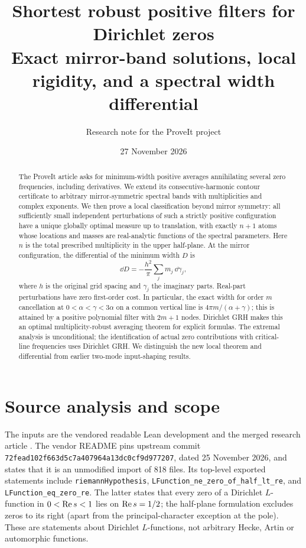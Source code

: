 \documentclass[11pt]{article}
\title{\textbf{Shortest robust positive filters for Dirichlet zeros}\\[4pt]\large Exact mirror-band solutions, local rigidity, and a spectral width differential}
\author{Research note for the ProveIt project}
\date{27 November 2026}
\theoremstyle{remark}\newtheorem{remark}[theorem]{Remark}
\begin{document}
\maketitle
\begin{abstract}
The ProveIt article asks for minimum-width positive averages annihilating several zero frequencies, including derivatives. We extend its consecutive-harmonic contour certificate to arbitrary mirror-symmetric spectral bands with multiplicities and complex exponents. We then prove a local classification beyond mirror symmetry: all sufficiently small independent perturbations of such a strictly positive configuration have a unique globally optimal measure up to translation, with exactly $n+1$ atoms whose locations and masses are real-analytic functions of the spectral parameters. Here $n$ is the total prescribed multiplicity in the upper half-plane. At the mirror configuration, the differential of the minimum width $D$ is
\[
 \dd D=-\frac{h^2}{\pi}\sum_j m_j\,\dd\gamma_j,
\]
where $h$ is the original grid spacing and $\gamma_j$ the imaginary parts. Real-part perturbations have zero first-order cost. In particular, the exact width for order $m$ cancellation at $0<\alpha<\gamma<3\alpha$ on a common vertical line is $4\pi m/(\alpha+\gamma)$; this is attained by a positive polynomial filter with $2m+1$ nodes. Dirichlet GRH makes this an optimal multiplicity-robust averaging theorem for explicit formulas. The extremal analysis is unconditional; the identification of actual zero contributions with critical-line frequencies uses Dirichlet GRH. We distinguish the new local theorem and differential from earlier two-mode input-shaping results.
\end{abstract}
\tableofcontents
\section{Source analysis and scope}
The inputs are the vendored readable Lean development \cite{vendor,main,statements,criterion} and the merged research article \cite{article,rec,zer}. The vendor README pins upstream commit \texttt{72fead102f663d5c7a407964a13dc0cf9d977207}, dated 25 November 2026, and states that it is an unmodified import of 818 files. Its top-level exported statements include \texttt{riemannHypothesis}, \texttt{LFunction\_ne\_zero\_of\_half\_lt\_re}, and \texttt{LFunction\_eq\_zero\_re}. The latter states that every zero of a Dirichlet $L$-function in $0<\operatorname{Re} s<1$ lies on $\operatorname{Re} s=1/2$; the half-plane formulation excludes zeros to its right (apart from the principal-character exception at the pole). These are statements about Dirichlet $L$-functions, not arbitrary Hecke, Artin or automorphic functions.
\end{document}
